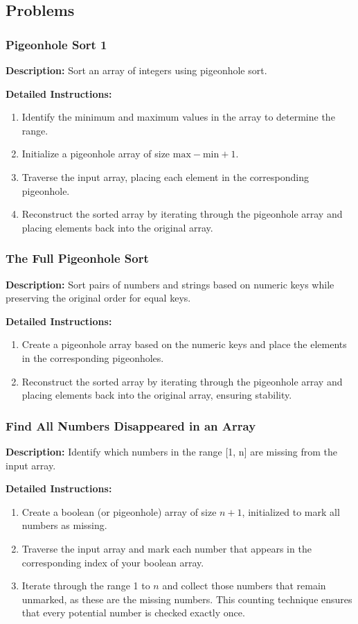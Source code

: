 \subsection{Problems}

\subsubsection{Pigeonhole Sort 1}
\textbf{Description:} Sort an array of integers using pigeonhole sort.

\textbf{Detailed Instructions:}
\begin{enumerate}
    \item Identify the minimum and maximum values in the array to determine the range.
    \item Initialize a pigeonhole array of size \(\text{max} - \text{min} + 1\).
    \item Traverse the input array, placing each element in the corresponding pigeonhole.
    \item Reconstruct the sorted array by iterating through the pigeonhole array and placing elements back into the original array.
\end{enumerate}

\subsubsection{The Full Pigeonhole Sort}
\textbf{Description:} Sort pairs of numbers and strings based on numeric keys while preserving the original order for equal keys.

\textbf{Detailed Instructions:}
\begin{enumerate}
    \item Create a pigeonhole array based on the numeric keys and place the elements in the corresponding pigeonholes.
    \item Reconstruct the sorted array by iterating through the pigeonhole array and placing elements back into the original array, ensuring stability.
\end{enumerate}

\subsubsection{Find All Numbers Disappeared in an Array}
\textbf{Description:} Identify which numbers in the range [1, n] are missing from the input array.

\textbf{Detailed Instructions:}
\begin{enumerate}
    \item Create a boolean (or pigeonhole) array of size \(n+1\), initialized to mark all numbers as missing.
    \item Traverse the input array and mark each number that appears in the corresponding index of your boolean array.
    \item Iterate through the range 1 to \(n\) and collect those numbers that remain unmarked, as these are the missing numbers. This counting technique ensures that every potential number is checked exactly once.
\end{enumerate}

